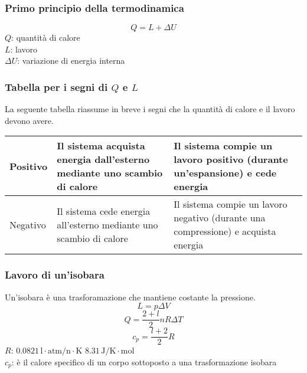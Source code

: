 \subsubsection{Primo principio della termodinamica}
\begin{equation*}
Q = L+\Delta U
\end{equation*}
$Q$: quantità di calore\\
$L$: lavoro\\
$\Delta U$: variazione di energia interna

\subsubsection{Tabella per i segni di $Q$ e $L$}
La seguente tabella riassume in breve i segni che la quantità di calore e il lavoro devono avere.
\tablelasttail{\bottomrule}
\begin{center}
  \begin{xtabular}{M{2cm} M{2cm} M{2cm}}
    Positivo & Il sistema acquista energia dall'esterno mediante uno scambio di calore &
    Il sistema compie un lavoro positivo (durante un'espansione) e cede energia\\ \midrule
    Negativo & Il sistema cede energia all'esterno mediante uno scambio di calore &
    Il sistema compie un lavoro negativo (durante una compressione) e acquista energia\\ \midrule
  \end{xtabular}
\end{center}

\subsubsection{Lavoro di un'isobara}
Un'isobara è una trasforamazione che mantiene costante la pressione.
\begin{equation*}
L = p\Delta V
\end{equation*}
\begin{equation*}
Q = \frac{2+l}{2}nR\Delta T
\end{equation*}
\begin{equation*}
c_p = \frac{l+2}{2}R
\end{equation*}
\hyperref[tab:R]{$R$}: $0.0821\,\text{l}\cdot\text{atm/n}\cdot\text{K}$
$8.31\,\text{J/K}\cdot\text{mol}$\\
$c_p$: è il calore specifico di un corpo sottoposto a una trasformazione isobara

